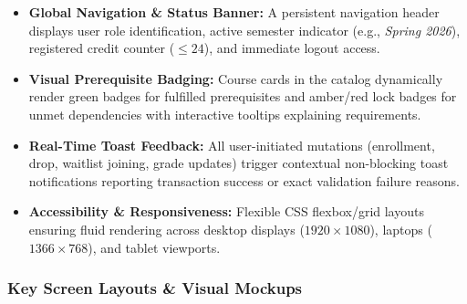 \documentclass[a4paper,12pt]{article}
\begin{document}
\begin{itemize}[leftmargin=1.2cm]
    \item \textbf{Global Navigation \& Status Banner:} A persistent navigation header displays user role identification, active semester indicator (e.g., \textit{Spring 2026}), registered credit counter ($\le 24$), and immediate logout access.
    \item \textbf{Visual Prerequisite Badging:} Course cards in the catalog dynamically render green badges for fulfilled prerequisites and amber/red lock badges for unmet dependencies with interactive tooltips explaining requirements.
    \item \textbf{Real-Time Toast Feedback:} All user-initiated mutations (enrollment, drop, waitlist joining, grade updates) trigger contextual non-blocking toast notifications reporting transaction success or exact validation failure reasons.
    \item \textbf{Accessibility \& Responsiveness:} Flexible CSS flexbox/grid layouts ensuring fluid rendering across desktop displays ($1920\times1080$), laptops ($1366\times768$), and tablet viewports.
\end{itemize}

\subsubsection{Key Screen Layouts \& Visual Mockups}
\end{document}
